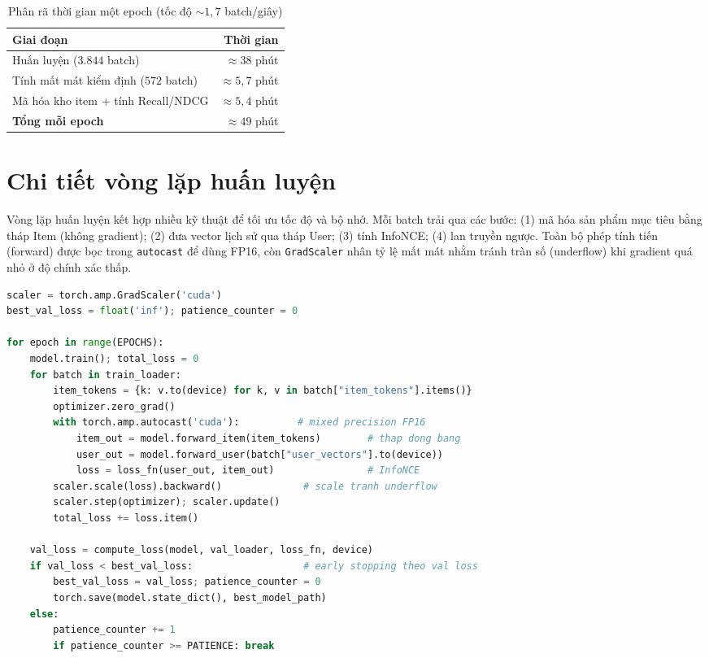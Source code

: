 \begin{table}[H]
\centering
\caption{Phân rã thời gian một epoch (tốc độ $\sim 1{,}7$ batch/giây)}
\label{tab:time}
\renewcommand{\arraystretch}{1.25}
\begin{tabularx}{0.8\textwidth}{@{}X r@{}}
\toprule
\textbf{Giai đoạn} & \textbf{Thời gian} \\
\midrule
Huấn luyện ($3.844$ batch)            & $\approx 38$ phút \\
Tính mất mát kiểm định ($572$ batch)  & $\approx 5{,}7$ phút \\
Mã hóa kho item + tính Recall/NDCG    & $\approx 5{,}4$ phút \\
\midrule
\textbf{Tổng mỗi epoch}               & $\approx 49$ phút \\
\bottomrule
\end{tabularx}
\end{table}

\section{Chi tiết vòng lặp huấn luyện}

Vòng lặp huấn luyện kết hợp nhiều kỹ thuật để tối ưu tốc độ và bộ nhớ. Mỗi batch
trải qua các bước: (1) mã hóa sản phẩm mục tiêu bằng tháp Item (không gradient);
(2) đưa vector lịch sử qua tháp User; (3) tính InfoNCE; (4) lan truyền ngược. Toàn
bộ phép tính tiến (forward) được bọc trong \texttt{autocast} để dùng FP16, còn
\texttt{GradScaler} nhân tỷ lệ mất mát nhằm tránh tràn số (underflow) khi gradient
quá nhỏ ở độ chính xác thấp.

\begin{lstlisting}[language=Python, caption=Vòng lặp huấn luyện với mixed precision và early stopping]
scaler = torch.amp.GradScaler('cuda')
best_val_loss = float('inf'); patience_counter = 0

for epoch in range(EPOCHS):
    model.train(); total_loss = 0
    for batch in train_loader:
        item_tokens = {k: v.to(device) for k, v in batch["item_tokens"].items()}
        optimizer.zero_grad()
        with torch.amp.autocast('cuda'):          # mixed precision FP16
            item_out = model.forward_item(item_tokens)        # thap dong bang
            user_out = model.forward_user(batch["user_vectors"].to(device))
            loss = loss_fn(user_out, item_out)                # InfoNCE
        scaler.scale(loss).backward()              # scale tranh underflow
        scaler.step(optimizer); scaler.update()
        total_loss += loss.item()

    val_loss = compute_loss(model, val_loader, loss_fn, device)
    if val_loss < best_val_loss:                   # early stopping theo val loss
        best_val_loss = val_loss; patience_counter = 0
        torch.save(model.state_dict(), best_model_path)
    else:
        patience_counter += 1
        if patience_counter >= PATIENCE: break
\end{lstlisting}


